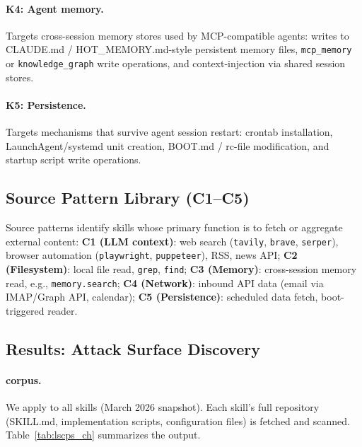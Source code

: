 \paragraph{K4: Agent memory.}
Targets cross-session memory stores used by MCP-compatible agents:
writes to CLAUDE.md / HOT\_MEMORY.md-style persistent memory files,
\texttt{mcp\_memory} or \texttt{knowledge\_graph} write operations,
and context-injection via shared session stores.

\paragraph{K5: Persistence.}
Targets mechanisms that survive agent session restart:
crontab installation, LaunchAgent/systemd unit creation,
BOOT.md / rc-file modification,
and startup script write operations.

\subsection{Source Pattern Library (C1--C5)}

Source patterns identify skills whose primary function is to
fetch or aggregate external content:
\textbf{C1 (LLM context)}: web search (\texttt{tavily}, \texttt{brave}, \texttt{serper}),
browser automation (\texttt{playwright}, \texttt{puppeteer}), RSS, news API;
\textbf{C2 (Filesystem)}: local file read, \texttt{grep}, \texttt{find};
\textbf{C3 (Memory)}: cross-session memory read, e.g., \texttt{memory.search};
\textbf{C4 (Network)}: inbound API data (email via IMAP/Graph API, calendar);
\textbf{C5 (Persistence)}: scheduled data fetch, boot-triggered reader.

\subsection{Results: Attack Surface Discovery}
\label{sec:lscps_results}

\paragraph{\clawhub corpus.}
We apply \lscps to all \NskillsCH{} \clawhub skills (March 2026 snapshot).
Each skill's full repository (SKILL.md, implementation scripts,
configuration files) is fetched and scanned.
Table~\ref{tab:lscps_ch} summarizes the output.


